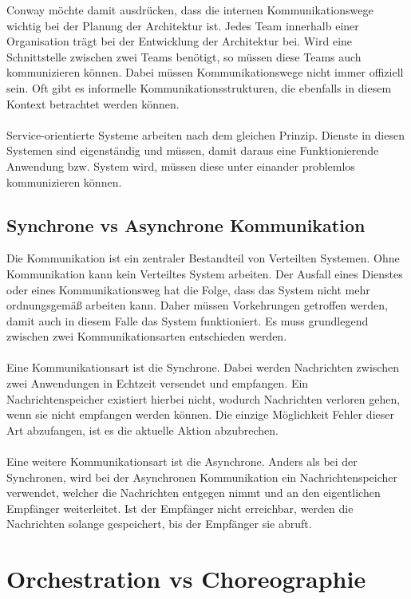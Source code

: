 Conway möchte damit ausdrücken, dass die internen Kommunikationswege wichtig bei der Planung der Architektur ist. Jedes Team innerhalb einer Organisation trägt bei der Entwicklung der Architektur bei. Wird eine Schnittstelle zwischen zwei Teams benötigt, so müssen diese Teams auch kommunizieren können. Dabei müssen Kommunikationswege nicht immer offiziell sein. Oft gibt es informelle Kommunikationsstrukturen, die ebenfalls in diesem Kontext betrachtet werden können.
\\\\
Service-orientierte Systeme arbeiten nach dem gleichen Prinzip. Dienste in diesen Systemen sind eigenständig und müssen, damit daraus eine Funktionierende Anwendung bzw. System wird, müssen diese unter einander problemlos kommunizieren können.

\subsection{Synchrone vs Asynchrone Kommunikation}
\label{subsec:KommunikationASynchrone}
Die Kommunikation ist ein zentraler Bestandteil von Verteilten Systemen. Ohne Kommunikation kann kein Verteiltes System arbeiten. Der Ausfall eines Dienstes oder eines Kommunikationsweg hat die Folge, dass das System nicht mehr ordnungsgemäß arbeiten kann. Daher müssen Vorkehrungen getroffen werden, damit auch in diesem Falle das System funktioniert. Es muss grundlegend zwischen zwei Kommunikationsarten entschieden werden.
\\\\
Eine Kommunikationsart ist die Synchrone. Dabei werden Nachrichten zwischen zwei Anwendungen in Echtzeit versendet und empfangen. Ein Nachrichtenspeicher existiert hierbei nicht, wodurch Nachrichten verloren gehen, wenn sie nicht empfangen werden können. Die einzige Möglichkeit Fehler dieser Art abzufangen, ist es die aktuelle Aktion abzubrechen.
\\\\
Eine weitere Kommunikationsart ist die Asynchrone. Anders als bei der Synchronen, wird bei der Asynchronen Kommunikation ein Nachrichtenspeicher verwendet, welcher die Nachrichten entgegen nimmt und an den eigentlichen Empfänger weiterleitet. Ist der Empfänger nicht erreichbar, werden die Nachrichten solange gespeichert, bis der Empfänger sie abruft.

\section{Orchestration vs Choreographie}
\label{sec:OrchestrationVsChoregraphie}

